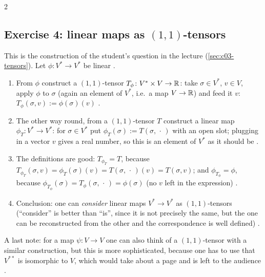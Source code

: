 \begin{paracol}{2}
\subsection*{Exercise 4: linear maps as $(1,1)$-tensors}

This is the construction of the student's question in the lecture (\cref{sec:c03-tensors}). Let $\phi\colon V^*\to V^*$ be linear .
\begin{enumerate}
  \item From $\phi$ construct a $(1,1)$-tensor $T_\phi\colon V^*\times V\to\mathbb{R}$: take $\sigma\in V^*$, $v\in V$, apply $\phi$ to $\sigma$ (again an element of $V^*$, i.e.\ a map $V\to\mathbb{R}$) and feed it $v$:
        $T_\phi(\sigma,v):=\phi(\sigma)(v)$ .
  \item The other way round, from a $(1,1)$-tensor $T$ construct a linear map $\phi_T\colon V^*\to V^*$: for $\sigma\in V^*$ put $\phi_T(\sigma):=T(\sigma,\,\cdot\,)$ with an open slot; plugging in a vector $v$ gives a real number, so this is an element of $V^*$ as it should be
        .
  \item The definitions are good: $T_{\phi_T}=T$, because $T_{\phi_T}(\sigma,v)=\phi_T(\sigma)(v)=T(\sigma,\,\cdot\,)(v)=T(\sigma,v)$; and $\phi_{T_\phi}=\phi$, because $\phi_{T_\phi}(\sigma)=T_\phi(\sigma,\,\cdot\,)=\phi(\sigma)$ (no $v$ left in the expression)
        .
  \item Conclusion: one can \emph{consider} linear maps $V^*\to V^*$ as $(1,1)$-tensors (``consider'' is better than ``is'', since it is not precisely the same, but the one can be reconstructed from the other and the correspondence is well defined) .
\end{enumerate}
A last note: for a map $\psi\colon V\to V$ one can also think of a $(1,1)$-tensor with a similar construction, but this is more sophisticated, because one has to use that $V^{**}$ is isomorphic to $V$, which would take about a page and is left to the audience .


\end{paracol}
